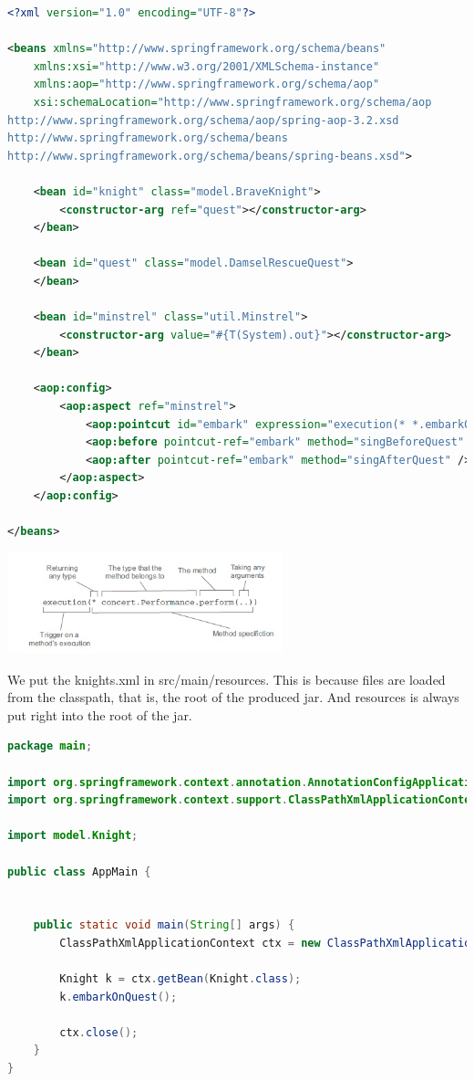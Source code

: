 \begin{lstlisting}[language=xml]
<?xml version="1.0" encoding="UTF-8"?>

<beans xmlns="http://www.springframework.org/schema/beans"
	xmlns:xsi="http://www.w3.org/2001/XMLSchema-instance" 
	xmlns:aop="http://www.springframework.org/schema/aop"
	xsi:schemaLocation="http://www.springframework.org/schema/aop
http://www.springframework.org/schema/aop/spring-aop-3.2.xsd
http://www.springframework.org/schema/beans
http://www.springframework.org/schema/beans/spring-beans.xsd">

	<bean id="knight" class="model.BraveKnight">
		<constructor-arg ref="quest"></constructor-arg>
	</bean>

	<bean id="quest" class="model.DamselRescueQuest">
	</bean>

	<bean id="minstrel" class="util.Minstrel">
		<constructor-arg value="#{T(System).out}"></constructor-arg>
	</bean>

	<aop:config>
		<aop:aspect ref="minstrel">
			<aop:pointcut id="embark" expression="execution(* *.embarkOnQuest(..))" />
			<aop:before pointcut-ref="embark" method="singBeforeQuest" />
			<aop:after pointcut-ref="embark" method="singAfterQuest" />
		</aop:aspect>
	</aop:config>

</beans>
\end{lstlisting}


\includegraphics[width=8cm]{images/pointcut.png}

We put the knights.xml in src/main/resources. This is because files are loaded from the classpath, that is, the root of the produced jar. And resources is always put right into the root of the jar. 

\begin{lstlisting}[language=java]
package main;

import org.springframework.context.annotation.AnnotationConfigApplicationContext;
import org.springframework.context.support.ClassPathXmlApplicationContext;

import model.Knight;

public class AppMain {

	
	public static void main(String[] args) {
		ClassPathXmlApplicationContext ctx = new ClassPathXmlApplicationContext("knights.xml");

		Knight k = ctx.getBean(Knight.class);
		k.embarkOnQuest();
		
		ctx.close();
	}
}
\end{lstlisting}




